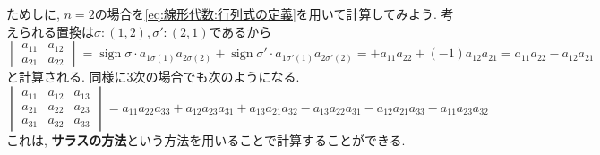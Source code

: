 \documentclass[a4j,dvipdfmx]{jsarticle}
\numberwithin{equation}{section}
\newcommand{\sign}{\mathop{\mathrm{sign}}\nolimits}
\begin{document}
            ためしに, $n=2$の場合を\eqref{eq:線形代数:行列式の定義}を用いて計算してみよう. 考えられる置換は$\sigma:(1,2),\sigma':(2,1)$であるから
            \begin{equation*}
                \begin{vmatrix}
                    a_{11} & a_{12} \\ a_{21} & a_{22}
                \end{vmatrix} = \sign\sigma \cdot a_{1\sigma(1)}a_{2\sigma(2)}+\sign\sigma'\cdot a_{1\sigma'(1)}a_{2\sigma'(2)}=+a_{11}a_{22}+(-1)a_{12}a_{21}=a_{11}a_{22}-a_{12}a_{21}
            \end{equation*}
            と計算される.
            \clearpage
            同様に3次の場合でも次のようになる.
            \begin{equation*}
                \begin{vmatrix}
                    a_{11} & a_{12} & a_{13} \\ 
                    a_{21} & a_{22} & a_{23} \\ 
                    a_{31} & a_{32} & a_{33}
                \end{vmatrix}
                =
                a_{11} a_{22} a_{33} + a_{12} a_{23} a_{31} + a_{13} a_{21} a_{32} 
                - a_{13} a_{22} a_{31} - a_{12} a_{21} a_{33} - a_{11} a_{23} a_{32}                
            \end{equation*}
            これは, \textbf{サラスの方法}という方法を用いることで計算することができる.
\end{document}

